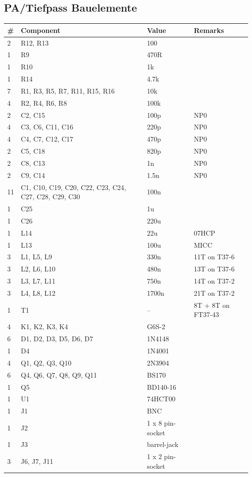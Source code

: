 \documentclass[10pt, a4paper,twoside]{scrartcl}
\begin{document}
\subsection{PA/Tiefpass Bauelemente}  \label{sec:pacomp}
\begin{longtable}{|l|p{6cm}|l|l|} \hline 
\# & Component & Value & Remarks \\ \hline 
2 & R12, R13 & 100 & \\
1 & R9 & 470R & \\
1 & R10 & 1k & \\
1 & R14 & 4.7k & \\
7 & R1, R3, R5, R7, R11, R15, R16 & 10k & \\
4 & R2, R4, R6, R8 & 100k & \\
2 & C2, C15 & 100p & NP0 \\
4 & C3, C6, C11, C16 & 220p & NP0 \\
4 & C4, C7, C12, C17 & 470p & NP0 \\
2 & C5, C18 & 820p & NP0 \\
2 & C8, C13 & 1n & NP0 \\
2 & C9, C14 & 1.5n & NP0 \\
11 & C1, C10, C19, C20, C22, C23, C24, C27, C28, C29, C30 & 100n & \\
1 & C25 & 1u & \\
1 & C26 & 220u & \\
1 & L14 & 22u & 07HCP \\
1 & L13 & 100u & MICC \\
3 & L1, L5, L9 & 330n & 11T on T37-6 \\
3 & L2, L6, L10 & 480n & 13T on T37-6 \\
3 & L3, L7, L11 & 750n & 14T on T37-2 \\
3 & L4, L8, L12 & 1700n & 21T on T37-2 \\
1 & T1 & -- & 8T + 8T on FT37-43 \\
4 & K1, K2, K3, K4 & G6S-2 & \\
6 & D1, D2, D3, D5, D6, D7 & 1N4148 & \\
1 & D4 & 1N4001 & \\	
4 & Q1, Q2, Q3, Q10 & 2N3904 & \\
6 & Q4, Q6, Q7, Q8, Q9, Q11 & BS170 & \\
1 & Q5 & BD140-16 & \\
1 & U1 & 74HCT00 & \\
1 & J1 & BNC & \\
1 & J2 & 1 x 8 pin-socket & \\
1 & J3 & barrel-jack & \\
3 & J6, J7, J11 & 1 x 2 pin-socket & \\ \hline
\end{longtable}
\end{document}
